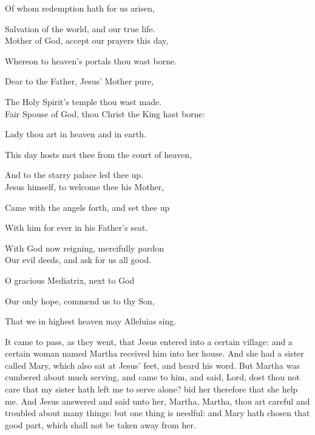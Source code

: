 \begin{multicols}{2}
Of whom redemption hath for us arisen,

Salvation of the world, and our true life.\\

Mother of God, accept our prayers this day,

Whereon to heaven's portals thou wast borne.

Dear to the Father, Jesus' Mother pure,

The Holy Spirit's temple thou wast made.\\

Fair Spouse of God, thou Christ the King hast borne:

Lady thou art in heaven and in earth.

This day hosts met thee from the court of heaven,

And to the starry palace led thee up.\\

Jesus himself, to welcome thee his Mother,

Came with the angels forth, and set thee up

With him for ever in his Father's seat.

With God now reigning, mercifully pardon\\

Our evil deeds, and ask for us all good.

O gracious Mediatrix, next to God

Our only hope, commend us to thy Son,

That we in highest heaven may Alleluias sing.
\end{multicols}

\vspace{-1ex}
 It came to pass, as they went, that Jesus entered into a certain village: and a certain woman named Martha received him into her house. And she had a sister called Mary, which also sat at Jesus' feet, and heard his word. But Martha was cumbered about much serving, and came to him, and said, Lord, dost thou not care that my sister hath left me to serve alone? bid her therefore that she help me. And Jesus answered and said unto her, Martha, Martha, thou art careful and troubled about many things: but one thing is needful: and Mary hath chosen that good part, which shall not be taken away from her.


